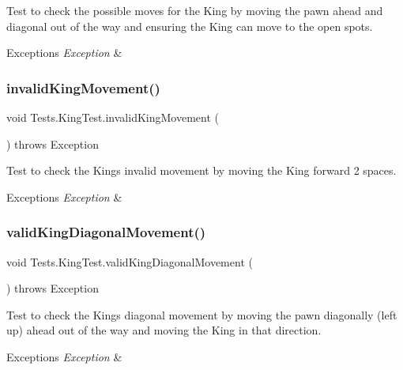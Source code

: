 Test to check the possible moves for the King by moving the pawn ahead and diagonal out of the way and ensuring the King can move to the open spots. 
\begin{DoxyExceptions}{Exceptions}
{\em Exception} & \\
\hline
\end{DoxyExceptions}
\hypertarget{class_tests_1_1_king_test_a9f87b45c5ea04ab26343e828ffac02f6}{}\label{class_tests_1_1_king_test_a9f87b45c5ea04ab26343e828ffac02f6} 
\subsubsection{\texorpdfstring{invalid\+King\+Movement()}{invalidKingMovement()}}
{\footnotesize\ttfamily void Tests.\+King\+Test.\+invalid\+King\+Movement (\begin{DoxyParamCaption}{ }\end{DoxyParamCaption}) throws Exception}

Test to check the King\textquotesingle{}s invalid movement by moving the King forward 2 spaces. 
\begin{DoxyExceptions}{Exceptions}
{\em Exception} & \\
\hline
\end{DoxyExceptions}
\hypertarget{class_tests_1_1_king_test_a297113688dc835173504e520e6e1f8e5}{}\label{class_tests_1_1_king_test_a297113688dc835173504e520e6e1f8e5} 
\subsubsection{\texorpdfstring{valid\+King\+Diagonal\+Movement()}{validKingDiagonalMovement()}}
{\footnotesize\ttfamily void Tests.\+King\+Test.\+valid\+King\+Diagonal\+Movement (\begin{DoxyParamCaption}{ }\end{DoxyParamCaption}) throws Exception}

Test to check the King\textquotesingle{}s diagonal movement by moving the pawn diagonally (left up) ahead out of the way and moving the King in that direction. 
\begin{DoxyExceptions}{Exceptions}
{\em Exception} & \\
\hline
\end{DoxyExceptions}
\hypertarget{class_tests_1_1_king_test_ae1c17c791c61a55e41358e79d65efb6a}{}\label{class_tests_1_1_king_test_ae1c17c791c61a55e41358e79d65efb6a} 
